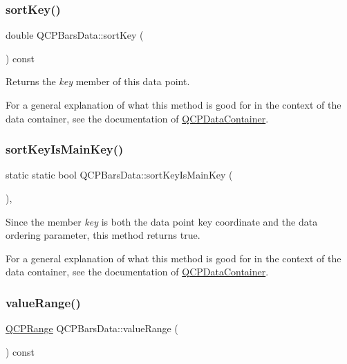 \subsubsection{\texorpdfstring{sortKey()}{sortKey()}}
{\footnotesize\ttfamily double Q\+C\+P\+Bars\+Data\+::sort\+Key (\begin{DoxyParamCaption}{ }\end{DoxyParamCaption}) const\hspace{0.3cm}{\ttfamily [inline]}}

Returns the {\itshape key} member of this data point.

For a general explanation of what this method is good for in the context of the data container, see the documentation of \mbox{\hyperlink{class_q_c_p_data_container}{Q\+C\+P\+Data\+Container}}. \mbox{\label{class_q_c_p_bars_data_aebaabda335bd4c9f81bd585d16b63aa8}} 
\subsubsection{\texorpdfstring{sortKeyIsMainKey()}{sortKeyIsMainKey()}}
{\footnotesize\ttfamily static static bool Q\+C\+P\+Bars\+Data\+::sort\+Key\+Is\+Main\+Key (\begin{DoxyParamCaption}{ }\end{DoxyParamCaption})\hspace{0.3cm}{\ttfamily [inline]}, {\ttfamily [static]}}

Since the member {\itshape key} is both the data point key coordinate and the data ordering parameter, this method returns true.

For a general explanation of what this method is good for in the context of the data container, see the documentation of \mbox{\hyperlink{class_q_c_p_data_container}{Q\+C\+P\+Data\+Container}}. \mbox{\label{class_q_c_p_bars_data_acf3e6479dacacd6c81eebe7d4cd62185}} 
\subsubsection{\texorpdfstring{valueRange()}{valueRange()}}
{\footnotesize\ttfamily \mbox{\hyperlink{class_q_c_p_range}{Q\+C\+P\+Range}} Q\+C\+P\+Bars\+Data\+::value\+Range (\begin{DoxyParamCaption}{ }\end{DoxyParamCaption}) const\hspace{0.3cm}{\ttfamily [inline]}}


